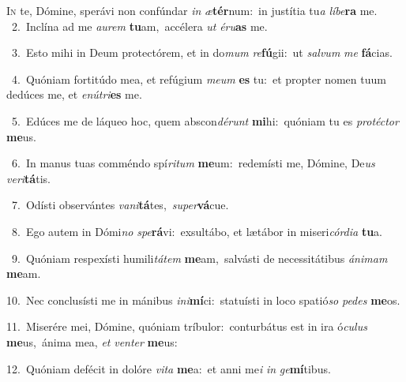\lettrine{\initial\textcolor{\initialcolor}{I}}{n} te, Dómine, sperávi non confúndar \textit{in} \textit{æ}\-\textbf{tér}num:~\star in justítia tu\textit{a} \textit{lí}\-\textit{be}\textbf{ra} me.\\
{\numbfont\textcolor{\numbcolor}{~2.}}~Inclína ad me \textit{au}\-\textit{rem} \textbf{tu}\-am,~\star accélera \textit{ut} \textit{é}\-\textit{ru}\textbf{as} me.\par
{\numbfont\textcolor{\numbcolor}{~3.}}~Esto mihi in Deum protectórem, et in do\textit{mum} \textit{re}\-\textbf{fú}gii:~\star ut \textit{sal}\-\textit{vum} \textit{me} \textbf{fá}\-cias.\par
{\numbfont\textcolor{\numbcolor}{~4.}}~Quóniam fortitúdo mea, et refúgium \textit{me}\-\textit{um} \textbf{es} tu:~\star et propter nomen tuum dedúces me, et \textit{e}\-\textit{nú}\textit{tri}\textbf{es} me.\par
{\numbfont\textcolor{\numbcolor}{~5.}}~Edúces me de láqueo hoc, quem abscon\-\textit{dé}\-\textit{runt} \textbf{mi}\-hi:~\star quóniam tu es \textit{pro}\-\textit{téc}\textit{tor} \textbf{me}\-us.\par
{\numbfont\textcolor{\numbcolor}{~6.}}~In manus tuas comméndo spí\-\textit{ri}\-\textit{tum} \textbf{me}\-um:~\star redemísti me, Dómine, De\textit{us} \textit{ve}\-\textit{ri}\textbf{tá}tis.\par
{\numbfont\textcolor{\numbcolor}{~7.}}~Odísti observántes \textit{va}\-\textit{ni}\textbf{tá}tes,~\star \textit{su}\-\textit{per}\textbf{vá}cue.\par
{\numbfont\textcolor{\numbcolor}{~8.}}~Ego autem in Dómi\textit{no} \textit{spe}\-\textbf{rá}vi:~\star exsultábo, et lætábor in miseri\-\textit{cór}\-\textit{di}\textit{a} \textbf{tu}\-a.\par
{\numbfont\textcolor{\numbcolor}{~9.}}~Quóniam respexísti humili\-\textit{tá}\-\textit{tem} \textbf{me}\-am,~\star salvásti de necessitátibus \textit{á}\-\textit{ni}\textit{mam} \textbf{me}\-am.\par
{\numbfont\textcolor{\numbcolor}{10.}}~Nec conclusísti me in mánibus \textit{in}\-\textit{i}\textbf{mí}ci:~\star statuísti in loco spatió\textit{so} \textit{pe}\-\textit{des} \textbf{me}\-os.\par
{\numbfont\textcolor{\numbcolor}{11.}}~Miserére mei, Dómine, quóniam tríbulor:~\dagger conturbátus est in ira ó\-\textit{cu}\-\textit{lus} \textbf{me}\-us,~\star ánima mea, \textit{et} \textit{ven}\-\textit{ter} \textbf{me}\-us:\par
{\numbfont\textcolor{\numbcolor}{12.}}~Quóniam defécit in dolóre \textit{vi}\-\textit{ta} \textbf{me}\-a:~\star et anni me\textit{i} \textit{in} \textit{ge}\-\textbf{mí}tibus.\par
